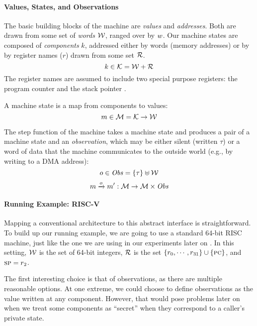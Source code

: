 \documentclass[acmsmall,review,anonymous]{acmart}\settopmatter{printfolios=true,printccs=false,printacmref=false}
\begin{document}
\paragraph*{Values, States, and Observations}

The basic building blocks of the machine are {\em values} and {\em
  addresses}. Both are drawn from some set of {\em words}
${\mathcal W}$, ranged over by $w$.
%
Our machine states are composed of {\em components} $k$, addressed either by
words (memory addresses) or by by register names ($r$) drawn from some set
${\mathcal R}$.
%
    \[k \in {\mathcal K} = {\mathcal W} + {\mathcal R} \]
%
The register names are assumed to include two special purpose registers: the
program counter {\PCname} and the stack pointer \SP.

A machine state is a map from components to values:
%
\[m \in {\mathcal M} = {\mathcal K} \rightarrow {\mathcal W}\]

The step function of the
machine takes a machine state and produces a pair of a
machine state and an {\em observation}, which may be either
silent (written $\tau$) or a word of data that the machine communicates to
the outside world (e.g., by writing to a DMA address):
%
\[o \in \mathit{Obs} = \{\tau\} \uplus {\mathcal W}\]
\[m \xrightarrow{o} m' : {\mathcal M} \rightarrow {\mathcal M} \times \mathit{Obs} \]
%

\paragraph*{Running Example: RISC-V}

Mapping a conventional architecture to this abstract interface is
straightforward. To build up our running example, we are going to use
a standard 64-bit RISC machine, just like the one we are using in our
experiments later on . In this setting, ${\mathcal W}$
is the set of 64-bit integers, ${\mathcal R}$ is the set $\{r_0, \cdots,
r_{31}\} \cup \{\textsc{pc}\}$, and $\textsc{sp} = r_2$.

The first interesting choice is that of observations, as there are
multiple reasonable options. At one extreme, we could choose to define
observations as the value written at any component. However, that
would pose problems later on when we treat some components as ``secret''
when they correspond to a caller's private state.   
\end{document}

